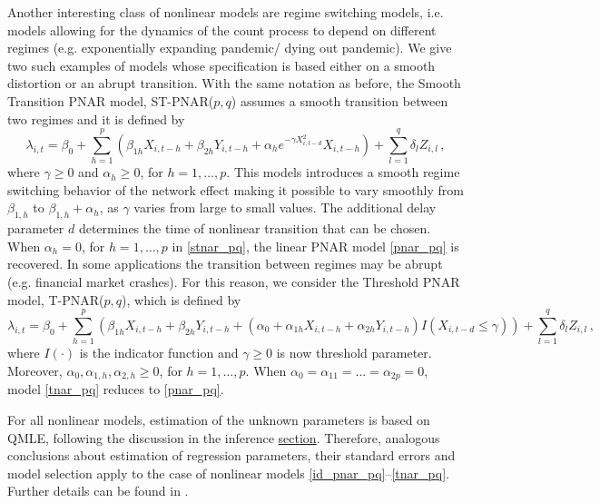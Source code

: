 Another interesting class of nonlinear models  are regime switching models, i.e. models allowing  for the dynamics of the count process to depend on different regimes (e.g. exponentially expanding pandemic/ dying out pandemic). We give two such examples of models whose specification is based either on a smooth distortion  or an abrupt transition. 
With the same notation as before,  the Smooth Transition PNAR model, ST-PNAR($p,q$) assumes  a smooth transition between  two regimes and it is defined by  
\begin{equation}
	\lambda_{i,t}=\beta_0+\sum_{h=1}^{p}\left( \beta_{1h}X_{i,t-h}+\beta_{2h}Y_{i,t-h} + \alpha_h e^{-\gamma X_{i,t-d}^2}X_{i,t-h}\right) + \sum_{l=1}^{q}\delta_lZ_{i,l} \,,
	\label{stnar_pq}
\end{equation}
where $\gamma \geq 0$ and $\alpha_{h} \geq 0$, for $h=1,\dots, p$. 
This models introduces a smooth regime switching behavior of  the network effect making it possible to vary smoothly  from $\beta_{1,h}$ to $\beta_{1,h} + \alpha_{h}$, as $\gamma$ varies from large to small values. The  additional delay parameter $d$ determines  the time of nonlinear transition that can be chosen.  
When $\alpha_h=0$, for $h=1,\dots,p$ in \eqref{stnar_pq}, the linear PNAR model \eqref{pnar_pq} is recovered. 
In some applications the transition between regimes may be abrupt  (e.g. financial market crashes).
For this reason, we consider the Threshold PNAR model, T-PNAR($p,q$), which is defined by
\begin{equation}
	\lambda_{i,t}=\beta_0+\sum_{h=1}^{p}\left( \beta_{1h}X_{i,t-h}+\beta_{2h}Y_{i,t-h} +\left( \alpha_0 + \alpha_{1h}X_{i,t-h}+\alpha_{2h}Y_{i,t-h}\right) I\left( X_{i,t-d} \leq \gamma \right)  \right) + \sum_{l=1}^{q}\delta_lZ_{i,l}\,,
	\label{tnar_pq}
\end{equation}
where $I(\cdot)$ is the indicator function and $\gamma \geq 0$ is now   threshold parameter. Moreover, $\alpha_{0}, \alpha_{1,h}, \alpha_{2,h} \geq 0$, for $h=1,\dots, p$. When $\alpha_{0}=\alpha_{11}=...=\alpha_{2p}=0$, model \eqref{tnar_pq} reduces to \eqref{pnar_pq}. 

For  all nonlinear models, estimation of the unknown parameters is based on  QMLE, following the 
discussion in the inference \hyperref[subsec:Inference]{section}.
Therefore,  analogous conclusions about estimation of regression parameters, their  standard errors and model selection  apply to the case of nonlinear models \eqref{id_pnar_pq}--\eqref{tnar_pq}. Further details can be found in \cite{armillotta_fokianos_2022_testing}. 

